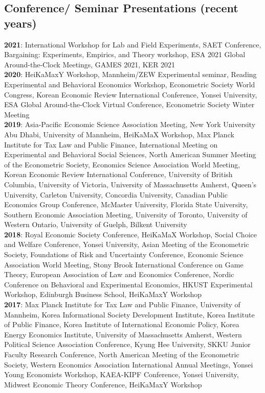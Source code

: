 \documentclass[margin, a4paper]{res}
\begin{document}
\begin{resume}
\section{Conference/ Seminar Presentations (recent years)}
\textbf{2021}: International Workshop for Lab and Field Experiments, SAET Conference, Bargaining: Experiments, Empirics, and Theory workshop, ESA 2021 Global Around-the-Clock Meetings, GAMES 2021, KER 2021\\%
\textbf{2020}: HeiKaMaxY Workshop, Mannheim/ZEW Experimental seminar, Reading Experimental and Behavioral Economics Workshop, Econometric Society World Congress, Korean Economic Review International Conference, Yonsei University, ESA Global Around-the-Clock Virtual Conference, Econometric Society Winter Meeting\\
\textbf{2019}: Asia-Pacific Economic Science Association Meeting, New York University Abu Dhabi, University of Mannheim, HeiKaMaX Workshop, Max Planck Institute for Tax Law and Public Finance, International Meeting on Experimental and Behavioral Social Sciences, North American Summer Meeting of the Econometric Society, Economics Science Association World Meeting, Korean Economic Review International Conference, University of British Columbia, University of Victoria, University of Massachusetts Amherst, Queen's University, Carleton University, Concordia University, Canadian Public Economics Group Conference, McMaster University, Florida State University, Southern Economic Association Meeting, University of Toronto, University of Western Ontario, University of Guelph, Bilkent University\\
\textbf{2018}: Royal Economic Society Conference, HeiKaMaX Workshop, Social Choice and Welfare Conference, Yonsei University, Asian Meeting of the Econometric Society, Foundations of Risk and Uncertainty Conference, Economic Science Association World Meeting, Stony Brook International Conference on Game Theory, European Association of Law and Economics Conference, Nordic Conference on Behavioral and Experimental Economics, HKUST Experimental Workshop, Edinburgh Business School, HeiKaMaxY Workshop\\
\textbf{2017}: Max Planck Institute for Tax Law and Public Finance, University of Mannheim, Korea Informational Society Development Institute, Korea Institute of Public Finance, Korea Institute of International Economic Policy, Korea Energy Economics Institute, University of Massachusetts Amherst, Western Political Science Association Conference, Kyung Hee University, SKKU Junior Faculty Research Conference, North American Meeting of the Econometric Society, Western Economics Association International Annual Meetings, Yonsei Young Economists Workshop, KAEA-KIPF Conference, Yonsei University, Midwest Economic Theory Conference, HeiKaMaxY Workshop%

\end{resume}
\end{document}
